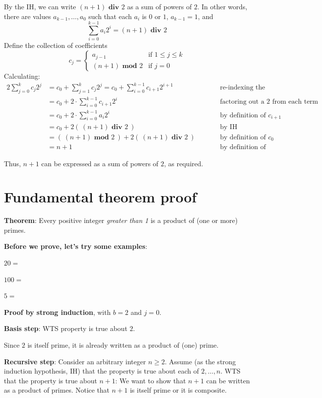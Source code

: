 \documentclass[12pt, oneside]{article}
\begin{document}
By the IH, we can write $(n+1) \textbf{ div } 2$ as 
a sum of powers of $2$. In other words, 
there are values $a_{k-1}, \ldots, a_0$ such that each $a_i$ is $0$ or $1$, $a_{k-1} = 1$, 
and
\[
    \sum_{i=0}^{k-1} a_i 2^i = (n+1) \textbf{ div } 2   
\]
Define the collection of coefficients
\[
   c_{j} = 
   \begin{cases}
        a_{j-1} \qquad&\text{if $1 \leq j \leq k$}\\
        (n+1) \textbf{ mod } 2 &\text{if $j = 0$}
   \end{cases}
\]
Calculating: 
\begin{alignat*}{2}
    \sum_{j=0}^k c_j 2^j &= c_0 + \sum_{j=1}^k c_j 2^j 
    = c_0 + \sum_{i=0}^{k-1} c_{i+1} 2^{i+1} &\qquad &\text{re-indexing the summation}\\
    &= c_0 + 2 \cdot \sum_{i=0}^{k-1} c_{i+1}2^i &\qquad &\text{factoring out a $2$ from each term in the sum}\\
    &= c_0 + 2 \cdot \sum_{i=0}^{k-1} a_{i} 2^i &\qquad &\text{by definition of $c_{i+1}$}\\
    &= c_0 + 2 \left(~(n+1) \textbf{ div } 2 ~\right) &\qquad &\text{by IH} \\
    &= \left(~ (n+1) \textbf{ mod } 2 ~\right ) + 2 \left(~(n+1) \textbf{ div } 2 ~\right) &\qquad &\text{by definition of $c_0$} \\
    &= n+1 &\qquad&\text{by definition of long division}
\end{alignat*}

Thus, $n+1$ can be expressed as a sum of powers of $2$, as required. \vfill
\section*{Fundamental theorem proof}


{\bf Theorem}: Every positive integer {\it greater than 1} is a product of (one or more) primes.

{\bf Before we prove, let's try some examples}:

$20 = $

$100 = $

$5 = $


{\bf Proof by strong induction}, with $b=2$ and $j=0$.

{\bf Basis step}:  WTS property is true about  $2$.

Since $2$ is itself prime,
it is already written as a product of (one) prime.


{\bf Recursive step}: Consider an arbitrary integer $n \geq 2$.
Assume (as the strong induction hypothesis, IH) that the property is true about  each of $2, \ldots, n$.  
WTS that the property is true about  $n+1$: We want to show that $n+1$ can be written 
as a product of primes.  Notice that $n+1$ is itself prime or it is composite.
\end{document}

